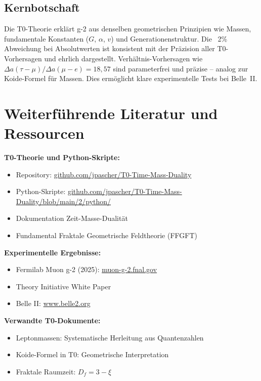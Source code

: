 	\subsection{Kernbotschaft}
	
	\begin{keypoint}
		Die T0-Theorie erklärt g-2 aus denselben geometrischen Prinzipien wie Massen, fundamentale Konstanten ($G$, $\alpha$, $v$) und Generationenstruktur. Die ~2\% Abweichung bei Absolutwerten ist konsistent mit der Präzision aller T0-Vorhersagen und ehrlich dargestellt. Verhältnis-Vorhersagen wie $\Delta a(\tau - \mu) / \Delta a(\mu - e) = 18{,}57$ sind parameterfrei und präzise -- analog zur Koide-Formel für Massen. Dies ermöglicht klare experimentelle Tests bei Belle~II.
	\end{keypoint}
	
	\section*{Weiterführende Literatur und Ressourcen}
	
	\textbf{T0-Theorie und Python-Skripte:}
	\begin{itemize}
		\item Repository: \href{https://github.com/jpascher/T0-Time-Mass-Duality}{github.com/jpascher/T0-Time-Mass-Duality}
		\item Python-Skripte: \href{https://github.com/jpascher/T0-Time-Mass-Duality/blob/main/2/python/}{github.com/jpascher/T0-Time-Mass-Duality/blob/main/2/python/}
		\item Dokumentation Zeit-Masse-Dualität
		\item Fundamental Fraktale Geometrische Feldtheorie (FFGFT)
	\end{itemize}
	
	\textbf{Experimentelle Ergebnisse:}
	\begin{itemize}
		\item Fermilab Muon g-2 (2025): \href{https://muon-g-2.fnal.gov/}{muon-g-2.fnal.gov}
		\item Theory Initiative White Paper
		\item Belle II: \href{https://www.belle2.org/}{www.belle2.org}
	\end{itemize}
	
	\textbf{Verwandte T0-Dokumente:}
	\begin{itemize}
		\item Leptonmassen: Systematische Herleitung aus Quantenzahlen
		\item Koide-Formel in T0: Geometrische Interpretation
		\item Fraktale Raumzeit: $D_f = 3 - \xi$
	\end{itemize}
	